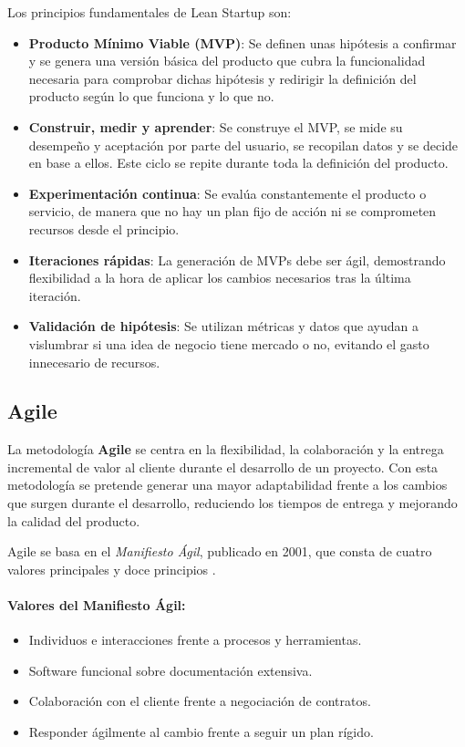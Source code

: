 Los principios fundamentales de Lean Startup son:

\begin{itemize}
  \item \textbf{Producto Mínimo Viable (MVP)}: Se definen unas hipótesis a confirmar y se genera una versión básica del producto que cubra la funcionalidad necesaria para comprobar dichas hipótesis y redirigir la definición del producto según lo que funciona y lo que no.

  \item \textbf{Construir, medir y aprender}: Se construye el MVP, se mide su desempeño y aceptación por parte del usuario, se recopilan datos y se decide en base a ellos. Este ciclo se repite durante toda la definición del producto.

  \item \textbf{Experimentación continua}: Se evalúa constantemente el producto o servicio, de manera que no hay un plan fijo de acción ni se comprometen recursos desde el principio.

  \item \textbf{Iteraciones rápidas}: La generación de MVPs debe ser ágil, demostrando flexibilidad a la hora de aplicar los cambios necesarios tras la última iteración.

  \item \textbf{Validación de hipótesis}: Se utilizan métricas y datos que ayudan a vislumbrar si una idea de negocio tiene mercado o no, evitando el gasto innecesario de recursos.
\end{itemize}

\subsection{Agile}

La metodología \textbf{Agile} se centra en la flexibilidad, la colaboración y la entrega incremental de valor al cliente durante el desarrollo de un proyecto. Con esta metodología se pretende generar una mayor adaptabilidad frente a los cambios que surgen durante el desarrollo, reduciendo los tiempos de entrega y mejorando la calidad del producto.

Agile se basa en el \textit{Manifiesto Ágil}, publicado en 2001, que consta de cuatro valores principales y doce principios \cite{agile-manifest} \cite{agile-manifest-principles}.

\paragraph{Valores del Manifiesto Ágil:}
\begin{itemize}
    \item Individuos e interacciones frente a procesos y herramientas.
    \item Software funcional sobre documentación extensiva.
    \item Colaboración con el cliente frente a negociación de contratos.
    \item Responder ágilmente al cambio frente a seguir un plan rígido.
\end{itemize}

